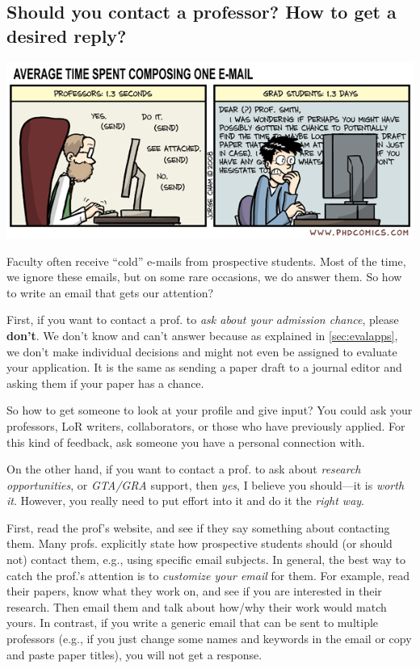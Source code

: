 \documentclass[oneside,11pt,dvipsnames]{book}
\begin{document}
\subsection{Should you contact a professor? How to get a desired reply?}\label{sec:contact}


\begin{center}
  \includegraphics[scale=0.6]{files/emails.png}
\end{center}


Faculty often receive ``cold'' e-mails from prospective students. Most of the time, we ignore these emails, but on some rare occasions, we do answer them. So how to write an email that gets our attention?

First, if you want to contact a prof. to \emph{ask about your admission chance}, please \textbf{don't}. We don't know and can't answer because as explained in \autoref{sec:evalapps}, we don't make individual decisions and might not even be assigned to evaluate your application.  It is the same as sending a paper draft to a journal editor and asking them if your paper has a chance.

So how to get someone to look at your profile and give input? You could ask your professors, LoR writers, collaborators, or those who have previously applied. For this kind of feedback, ask someone you have a personal connection with.

On the other hand, if you want to contact a prof. to ask about \emph{research opportunities}, or \emph{GTA/GRA} support, then \emph{yes}, I believe you should---it is \emph{worth it}. However, you really need to put effort into it and do it the \emph{right way}.

First, read the prof's website, and see if they say something about contacting them. Many profs. explicitly state how prospective students should (or should not) contact them, e.g., using specific email subjects.
In general, the best way to catch the prof.'s attention is to \emph{customize your email} for them.  For example, read their papers, know what they work on, and see if you are interested in their research. Then email them and talk about how/why their work would match yours.
In contrast, if you write a generic email that can be sent to multiple professors (e.g., if you just change some names and keywords in the email or copy and paste paper titles), you will not get a response.
\end{document}
